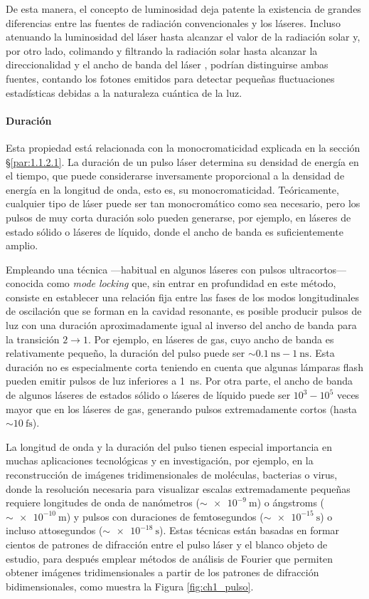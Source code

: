De esta manera, el concepto de luminosidad deja patente la existencia de grandes diferencias entre las fuentes de radiación convencionales y los láseres. Incluso atenuando la luminosidad del láser  hasta alcanzar el valor de la radiación solar y, por otro lado, colimando y filtrando la radiación solar hasta alcanzar la direccionalidad y el ancho de banda del láser , podrían distinguirse ambas fuentes, contando los fotones emitidos para detectar pequeñas fluctuaciones estadísticas debidas a la naturaleza cuántica de la luz. 

\paragraph{Duración}\label{par:1.1.2.5}
Esta propiedad está relacionada con la monocromaticidad explicada en la sección \S\ref{par:1.1.2.1}. La duración de un pulso láser determina su densidad de energía en el tiempo, que puede considerarse inversamente proporcional a la densidad de energía en la longitud de onda, esto es, su monocromaticidad\autocite{Svelto2010PrinciplesLasers}. Teóricamente, cualquier tipo de láser puede ser tan monocromático como sea necesario, pero los pulsos de muy corta duración solo pueden generarse, por ejemplo, en láseres de estado sólido o láseres de líquido, donde el ancho de banda es suficientemente amplio.

Empleando una técnica ---habitual en algunos láseres con pulsos ultracortos--- conocida como \emph{mode locking} que, sin entrar en profundidad en este método, consiste en establecer una relación fija entre las fases de los modos longitudinales de oscilación que se forman en la cavidad resonante, es posible producir pulsos de luz con una duración aproximadamente igual al inverso del ancho de banda para la transición $2 \rightarrow 1$. Por ejemplo, en láseres de gas, cuyo ancho de banda es relativamente pequeño, la duración del pulso puede ser $\sim\qty{0,1}{\ns}-\qty{1}{\ns}$. Esta duración no es especialmente corta teniendo en cuenta que algunas lámparas flash pueden emitir pulsos de luz inferiores a \qty{1}{\ns}. Por otra parte, el ancho de banda de algunos láseres de estados sólido o láseres de líquido puede ser $10^3-10^5$ veces mayor que en los láseres de gas, generando pulsos extremadamente cortos (hasta $\sim\qty{10}{\fs}$).

La longitud de onda y la duración del pulso tienen especial importancia en muchas aplicaciones tecnológicas y en investigación, por ejemplo, en la reconstrucción de imágenes tridimensionales de moléculas\autocite{vonArdenne2018StructureImage}, bacterias o virus\autocite{Ekeberg2015Three-DimensionalLaser}, donde la resolución necesaria para visualizar escalas extremadamente pequeñas requiere longitudes de onda de nanómetros ($\sim\qty{e-9}{\m}$) o ángstroms ($\sim\qty{e-10}{\m}$) y pulsos con duraciones de femtosegundos ($\sim\qty{e-15}{\s}$) o incluso attosegundos ($\sim\qty{e-18}{\s}$). Estas técnicas están basadas en formar cientos de patrones de difracción entre el pulso láser y el blanco objeto de estudio, para después emplear métodos de análisis de Fourier que permiten obtener imágenes tridimensionales a partir de los patrones de difracción bidimensionales, como muestra la Figura \ref{fig:ch1_pulso}.

